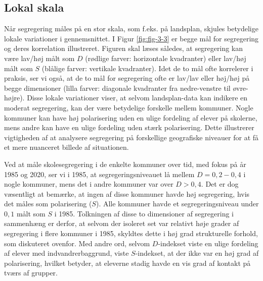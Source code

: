 \documentclass[
]{book}
\begin{document}
\subsection{Lokal skala}\label{lokal-skala}

Når segregering måles på en stor skala, som f.eks. på landsplan, skjules betydelige lokale variationer i gennemsnittet. I Figur \ref{fig:fig-3-3} er begge mål for segregering og deres korrelation illustreret. Figuren skal læses således, at segregering kan være lav/høj målt som \(D\) (rødlige farver: horizontale kvadranter) eller lav/høj målt som \(S\) (blålige farver: vertikale kvadranter). Idet de to mål ofte korrelerer i praksis, ser vi også, at de to mål for segregering ofte er lav/lav eller høj/høj på begge dimensioner (lilla farver: diagonale kvadranter fra nedre-venstre til øvre-højre). Disse lokale variationer viser, at selvom landsplan-data kan indikere en moderat segregering, kan der være betydelige forskelle mellem kommuner. Nogle kommuner kan have høj polarisering uden en ulige fordeling af elever på skolerne, mens andre kan have en ulige fordeling uden stærk polarisering. Dette illustrerer vigtigheden af at analysere segregering på forskellige geografiske niveauer for at få et mere nuanceret billede af situationen.

Ved at måle skolesegregering i de enkelte kommuner over tid, med fokus på år 1985 og 2020, ser vi i 1985, at segregeringsniveauet lå mellem \(D=0,2-0,4\) i nogle kommuner, mens det i andre kommuner var over \(D>0,4\). Det er dog væsentligt at bemærke, at ingen af disse kommuner havde høj segregering, hvis det måles som polarisering (\(S\)). Alle kommuner havde et segregeringsniveau under \(0,1\) målt som \(S\) i 1985. Tolkningen af disse to dimensioner af segregering i sammenhæng er derfor, at selvom der isoleret set var relativt høje grader af segregering i flere kommuner i 1985, skyldtes dette i høj grad strukturelle forhold, som diskuteret ovenfor. Med andre ord, selvom \(D\)-indekset viste en ulige fordeling af elever med indvandrerbaggrund, viste \(S\)-indekset, at der ikke var en høj grad af polarisering, hvilket betyder, at eleverne stadig havde en vis grad af kontakt på tværs af grupper.
\end{document}
